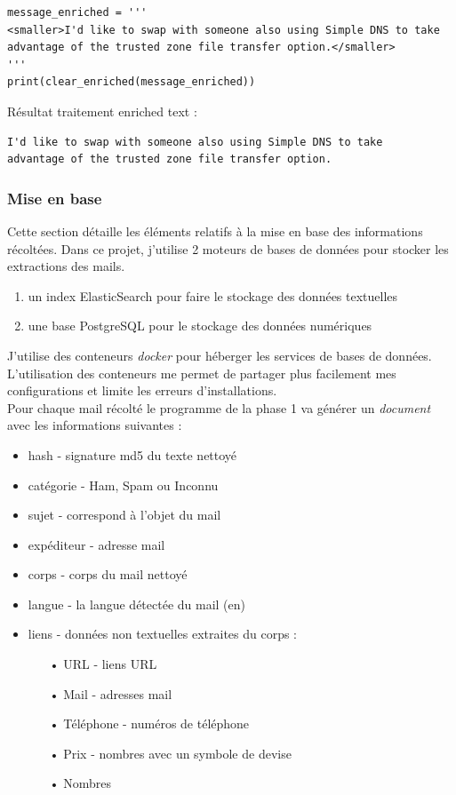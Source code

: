 \documentclass[a4paper,12pt]{article}
\begin{document}
				\begin{lstlisting}[title=Traitement enriched text]
message_enriched = '''
<smaller>I'd like to swap with someone also using Simple DNS to take
advantage of the trusted zone file transfer option.</smaller>
'''
print(clear_enriched(message_enriched))
				\end{lstlisting}
				Résultat traitement enriched text :
				\begin{verbatim}
I'd like to swap with someone also using Simple DNS to take
advantage of the trusted zone file transfer option.
				\end{verbatim}


		\subsubsection{Mise en base}
			Cette section détaille les éléments relatifs à la mise en base des informations récoltées. Dans ce projet, j'utilise 2 moteurs de bases de données pour stocker les extractions des mails. 
			\begin{enumerate}
				\item un index ElasticSearch pour faire le stockage des données textuelles
				\item une base PostgreSQL pour le stockage des données numériques
			\end{enumerate}
				 
			J'utilise des conteneurs \emph{docker} pour héberger les services de bases de données. 
			L'utilisation des conteneurs me permet de partager plus facilement mes configurations et limite les erreurs d'installations.\\
			
			Pour chaque mail récolté le programme de la phase 1 va générer un \emph{document} avec les informations suivantes :
				\begin{itemize}
					\item hash - signature md5 du texte nettoyé 
					\item catégorie - Ham, Spam ou Inconnu
					\item sujet - correspond à l'objet du mail
					\item expéditeur - adresse mail
					\item corps - corps du mail nettoyé
					\item langue - la langue détectée du mail (en)
					\item liens - données non textuelles extraites du corps :
						\begin{itemize}
							\item[•] URL - liens URL
							\item[•] Mail - adresses mail
							\item[•] Téléphone - numéros de téléphone
							\item[•] Prix - nombres avec un symbole de devise
							\item[•] Nombres
						\end{itemize}
				\end{itemize}
				
\end{document}
